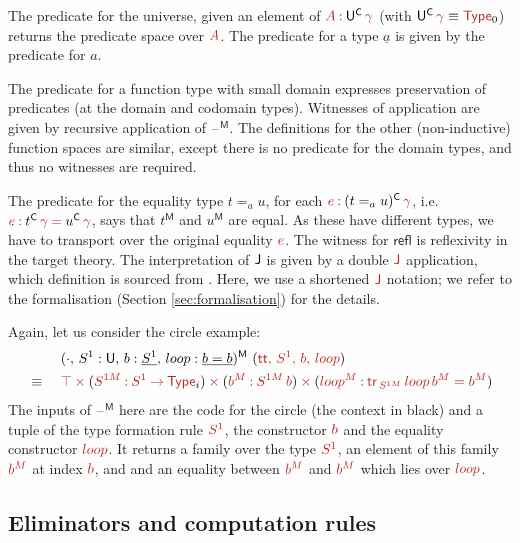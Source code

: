 \documentclass[a4paper,UKenglish]{lipics-v2018}
\newcommand{\U}{\mathsf{U}}
\newcommand{\ra}{\rightarrow}
\newcommand{\blank}{\mathord{\hspace{1pt}\text{--}\hspace{1pt}}} %
\newcommand{\C}{\mathsf{C}}
\newcommand{\M}{\mathsf{M}}
\newcommand{\refl}{\mathsf{refl}}
\newcommand{\1}{\mathsf{1}} \renewcommand{\Pr}{\mathsf{Pr}}
\renewcommand{\in}{\mathbin{\hat:}}
\renewcommand{\hat}[1]{{\color{BrickRed}{#1}}}
\newcommand{\rah}{\mathbin{\hat\ra}}
\newcommand{\timesh}{\mathbin{\hat\times}}
\newcommand{\eqh}{\mathbin{\hat=}}
\newcommand{\TR}{\hat{\mathsf{tr}}}
\renewcommand{\tt}{\hat{\mathsf{tt}}}
\newcommand{\Type}{\hat{\mathsf{Type}}}
\begin{document}
The predicate for the universe, given an element of
$\hat{A}\in\U^\C\,\hat{\gamma}$ (with $\U^\C\,\hat{\gamma}\equiv\Type_0$) returns the
predicate space over $\hat{A}$. The predicate for a type $\underline{a}$ is
given by the predicate for $a$.

The predicate for a function type with small domain expresses
preservation of predicates (at the domain and codomain
types). Witnesses of application are given by recursive application of
$\blank^\M$. The definitions for the other (non-inductive) function
spaces are similar, except there is no predicate for the domain types,
and thus no witnesses are required.

The predicate for the equality type $t=_a u$, for each
$\hat{e}\in(t=_a u)^\C\,\hat{\gamma}$, i.e.\ $\hat{e}\in
t^\C\,\hat{\gamma}\eqh u^\C\,\hat{\gamma}$, says that $t^\M$ and
$u^\M$ are equal. As these have different types, we have to transport
over the original equality $\hat{e}$. The witness for $\refl$ is
reflexivity in the target theory. The interpretation of $\mathsf{J}$ is given
by a double $\hat{\J}$ application, which definition is sourced from
\cite{lasson}. Here, we use a shortened $\hat{\J}$ notation; we refer
to the formalisation (Section \ref{sec:formalisation}) for the
details.

Again, let us consider the circle example:
\begin{alignat*}{5}
  & && (\cdot,\,S^1 : \U,\,b:\underline{S^1},\,loop: \underline{b=b})^\M\,\,(\hat{\tt,\,S^1,\,b,\,loop})\\
  & \equiv \,\, && \hat{\top}\timesh(\hat{S^{1M}}\in \hat{S^1}\rah\Type_i)\timesh(\hat{b^M}\in \hat{S^{1M}\,b})\timesh(\hat{loop^M\in \TR_{\,S^{1M}}\,loop\,b^M = b^M})
\end{alignat*}
The inputs of $\blank^\M$ here are the code for the circle (the
context in black) and a tuple of the type formation rule
$\hat{S^{1}}$, the constructor $\hat{b}$ and the equality constructor
$\hat{loop}$. It returns a family over the type $\hat{S^1}$, an
element of this family $\hat{b^M}$ at index $\hat{b}$, and and an
equality between $\hat{b^M}$ and $\hat{b^M}$ which lies over $\hat{loop}$.


\subsection{Eliminators and computation rules}
\label{sec:e}
\end{document}
